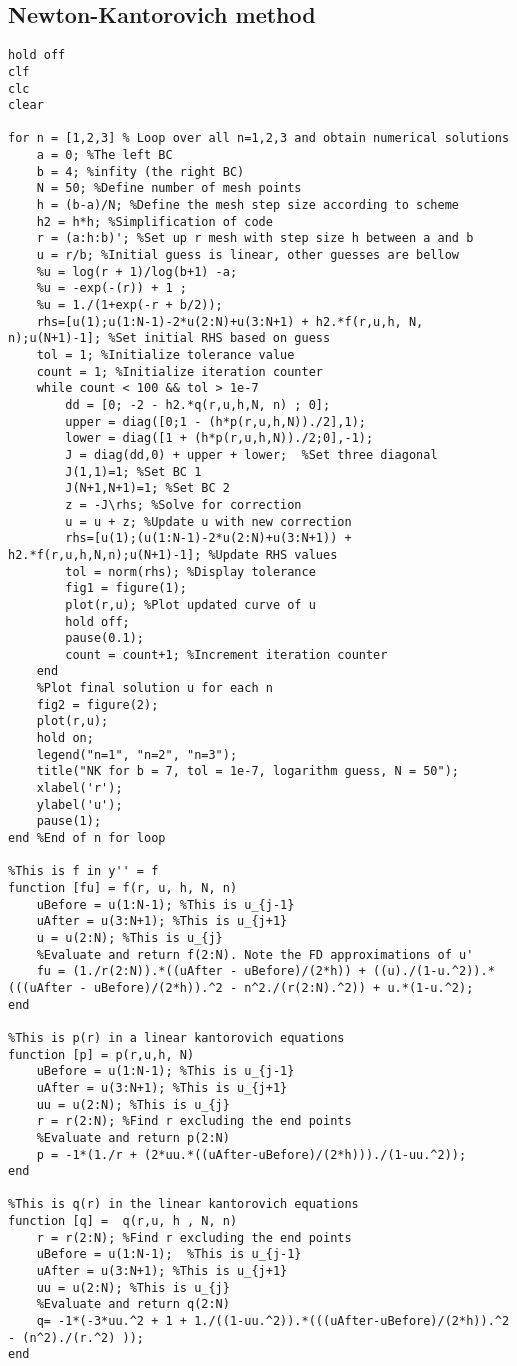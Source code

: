 \documentclass{article}
\begin{document}
\subsection{Newton-Kantorovich method}
\begin{lstlisting}
hold off
clf
clc
clear

for n = [1,2,3] % Loop over all n=1,2,3 and obtain numerical solutions
    a = 0; %The left BC
    b = 4; %infity (the right BC)
    N = 50; %Define number of mesh points
    h = (b-a)/N; %Define the mesh step size according to scheme
    h2 = h*h; %Simplification of code
    r = (a:h:b)'; %Set up r mesh with step size h between a and b
    u = r/b; %Initial guess is linear, other guesses are bellow
    %u = log(r + 1)/log(b+1) -a; 
    %u = -exp(-(r)) + 1 ;
    %u = 1./(1+exp(-r + b/2)); 
    rhs=[u(1);u(1:N-1)-2*u(2:N)+u(3:N+1) + h2.*f(r,u,h, N, n);u(N+1)-1]; %Set initial RHS based on guess
    tol = 1; %Initialize tolerance value
    count = 1; %Initialize iteration counter
    while count < 100 && tol > 1e-7
        dd = [0; -2 - h2.*q(r,u,h,N, n) ; 0];
        upper = diag([0;1 - (h*p(r,u,h,N))./2],1);
        lower = diag([1 + (h*p(r,u,h,N))./2;0],-1);
        J = diag(dd,0) + upper + lower;  %Set three diagonal
        J(1,1)=1; %Set BC 1
        J(N+1,N+1)=1; %Set BC 2
        z = -J\rhs; %Solve for correction
        u = u + z; %Update u with new correction
        rhs=[u(1);(u(1:N-1)-2*u(2:N)+u(3:N+1)) + h2.*f(r,u,h,N,n);u(N+1)-1]; %Update RHS values
        tol = norm(rhs); %Display tolerance
        fig1 = figure(1);
        plot(r,u); %Plot updated curve of u
        hold off;
        pause(0.1);
        count = count+1; %Increment iteration counter
    end
    %Plot final solution u for each n
    fig2 = figure(2);
    plot(r,u);
    hold on;
    legend("n=1", "n=2", "n=3");
    title("NK for b = 7, tol = 1e-7, logarithm guess, N = 50");
    xlabel('r');
    ylabel('u');
    pause(1);
end %End of n for loop

%This is f in y'' = f
function [fu] = f(r, u, h, N, n)
    uBefore = u(1:N-1); %This is u_{j-1}
    uAfter = u(3:N+1); %This is u_{j+1}
    u = u(2:N); %This is u_{j}
    %Evaluate and return f(2:N). Note the FD approximations of u' 
    fu = (1./r(2:N)).*((uAfter - uBefore)/(2*h)) + ((u)./(1-u.^2)).*(((uAfter - uBefore)/(2*h)).^2 - n^2./(r(2:N).^2)) + u.*(1-u.^2);
end 

%This is p(r) in a linear kantorovich equations
function [p] = p(r,u,h, N)
    uBefore = u(1:N-1); %This is u_{j-1}
    uAfter = u(3:N+1); %This is u_{j+1}
    uu = u(2:N); %This is u_{j}
    r = r(2:N); %Find r excluding the end points
    %Evaluate and return p(2:N)
    p = -1*(1./r + (2*uu.*((uAfter-uBefore)/(2*h)))./(1-uu.^2));
end

%This is q(r) in the linear kantorovich equations
function [q] =  q(r,u, h , N, n)
    r = r(2:N); %Find r excluding the end points
    uBefore = u(1:N-1);  %This is u_{j-1}
    uAfter = u(3:N+1); %This is u_{j+1}
    uu = u(2:N); %This is u_{j}
    %Evaluate and return q(2:N)
    q= -1*(-3*uu.^2 + 1 + 1./((1-uu.^2)).*(((uAfter-uBefore)/(2*h)).^2 - (n^2)./(r.^2) )); 
end
\end{lstlisting}
\pagebreak
\end{document}
